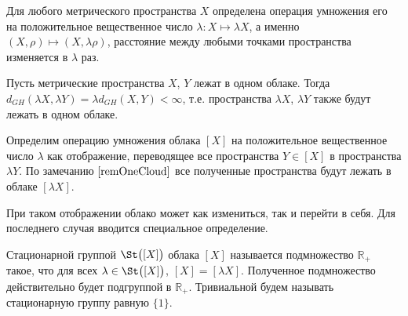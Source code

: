 Для любого метрического пространства $X$ определена операция умножения его
на положительное вещественное число $\lambda\colon X\mapsto \lambda X$, а именно
$(X, \rho) \mapsto (X, \lambda \rho)$, расстояние между любыми точками
пространства изменяется в $\lambda$ раз.
\begin{remark} Пусть метрические
  пространства $X$, $Y$ лежат в одном облаке. Тогда
  $d_{GH}(\lambda X, \lambda Y) = \lambda d_{GH}(X,Y) < \infty$, т.е.
  пространства
  $\lambda X$, $\lambda Y$ также будут лежать в одном облаке.
  \label{remOneCloud}
\end{remark}
\begin{definition}Определим операцию умножения облака $[X]$ на
  положительное вещественное
  число $\lambda$ как отображение, переводящее все пространства $Y \in [X]$ в
  пространства $\lambda Y$. По замечанию $\ref{remOneCloud}$ все
  полученные пространства будут
  лежать в облаке $[\lambda X]$.
\end{definition}

При таком отображении облако может как
измениться, так и перейти в себя. Для последнего случая вводится специальное
определение.
\begin{definition}
  Стационарной группой $\St\bigl([X]\bigr)$ облака $[X]$
  называется подмножество $\mathbb{R}_+$ такое, что для всех
  $\lambda \in \St\bigl([X]\bigr)$, $[X] = [\lambda X]$. Полученное подмножество
  действительно будет подгруппой в $\mathbb{R}_+$. Тривиальной
  будем называть стационарную группу равную $\{1\}$.
\end{definition}


